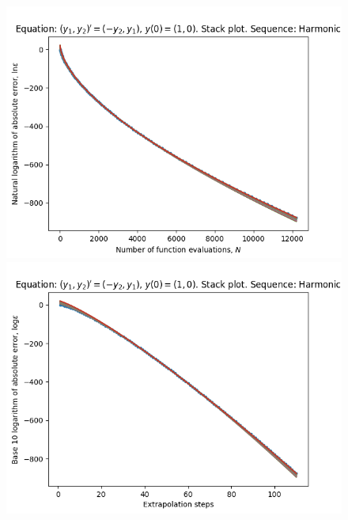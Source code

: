 \begin{figure}[H]
\centering
\begin{minipage}{0.45\textwidth}
\centering
\includegraphics[scale=0.45]{emr_plots/rotation_hp_harmonic_stack.png}
\end{minipage}
\begin{minipage}{0.45\textwidth}
\centering
\includegraphics[scale=0.45]{emr_plots/rotation_hp_harmonic_steps_stack.png}
\end{minipage}
\end{figure}


